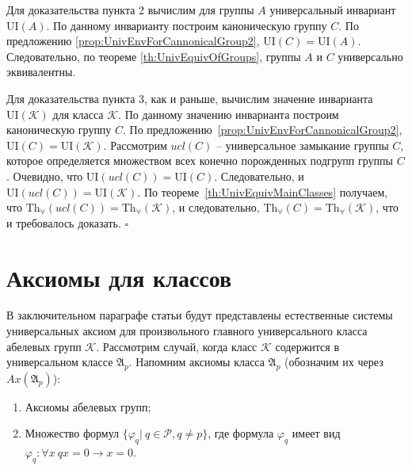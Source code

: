 \documentclass[a4paper,11pt,twoside]{article}
\def\A{{\mathfrak{A}}}
\def\K{{\mathcal{K}}}
\def\P{{\mathcal{P}}}
\def\Tha{{\mathrm{Th}_\forall}}
\def\ui{{\mathrm{UI}}}
\begin{document}
Для доказательства пункта 2 вычислим для группы $A$ универсальный инвариант $\ui(A)$. По данному инварианту построим каноническую группу $C$. По предложению \ref{prop:UnivEnvForCannonicalGroup2}, $\ui(C) = \ui(A)$. Следовательно, по теореме \ref{th:UnivEquivOfGroups}, группы $A$ и $C$ универсально эквивалентны.

Для доказательства пункта 3, как и раньше, вычислим значение инварианта $\ui(\K)$ для класса $\K$. По данному значению инварианта построим каноническую группу $C$. По предложению~\ref{prop:UnivEnvForCannonicalGroup2}, $\ui(C) = \ui(\K).$ Рассмотрим $ucl(C)$ -- универсальное замыкание группы $C$, которое определяется множеством всех конечно порожденных подгрупп группы $C$. Очевидно, что $\ui(ucl(C)) = \ui(C)$. Следовательно, и $\ui(ucl(C)) = \ui(\K)$. По теореме~\ref{th:UnivEquivMainClasses} получаем, что $\Tha(ucl(C)) = \Tha(\K)$, и следовательно, $\Tha(C) = \Tha(\K)$, что и требовалось доказать. $\square$






\section{Аксиомы для классов}\label{sec:lemmas}

В заключительном параграфе статьи будут представлены естественные системы универсальных аксиом для произвольного главного универсального класса абелевых групп $\K$. Рассмотрим случай, когда класс $\K$ содержится в универсальном классе $\A_p$. Напомним аксиомы класса $\A_p$ (обозначим их через $Ax(\A_p)$):
\begin{enumerate}
\item Аксиомы абелевых групп;
\item Множество формул $\{\varphi_q | \ q \in \P, q \neq p\}$, где формула $\varphi_q$ имеет вид $\varphi_q : \forall x \ qx = 0 \rightarrow x = 0$.
\end{enumerate}
\end{document}
